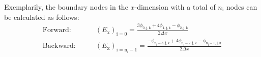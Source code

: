 Exemplarily, the boundary nodes in the $x$-dimension with a total of $n_\mathrm{i}$ nodes can be calculated as follows:
\begin{align}
\text{Forward:}&\quad\quad\left( E_\mathrm{x} \right)_\mathrm{i = \mathrm{0}} = \frac{3\phi_\mathrm{\mathrm{0}, j, k} + 4\phi_\mathrm{\mathrm{1}, j, k} - \phi_\mathrm{\mathrm{2}, j, k}}{2\Delta x}\\
\text{Backward:}&\quad\quad    \left( E_\mathrm{x} \right)_\mathrm{i = n_\mathrm{i}-1} = \frac{-\phi_\mathrm{n_\mathrm{i}-3, j, k} + 4\phi_\mathrm{n_\mathrm{i}-2, j, k} - \phi_\mathrm{n_\mathrm{i}-1, j, k}}{2\Delta x}
\end{align}


\begin{comment}

\begin{align}
    f_{i-2} - 4f_{i-1} &= f_i + (2\Delta x)\frac{\partial f}{\partial x} + 2(\Delta x)^2 \frac{\partial^2 f}{\partial x^2} - 4f_i - 4\Delta x \frac{\partial f}{\partial x} - \frac{4(\Delta x)^2}{2} \frac{\partial^2 f}{\partial x^2}\\
    &= -3f_i + 2\Delta x \frac{\partial f}{\partial x}\\
    \intertext{Umstellen der Gleichung führt zu:}
\end{align}


We use again taylor expansion for any function:
\begin{align}
f_{i+1} &= f_i + \frac{\Delta x}{1} \frac{\partial f}{\partial x} + \frac{(\Delta x)^2}{2} \frac{\partial^2 f}{\partial x^2} + \text{HOT}\\
f_{i-1} &= f_i - \frac{\Delta x}{1} \frac{\partial f}{\partial x} + \frac{(\Delta x)^2}{2} \frac{\partial^2 f}{\partial x^2} + \text{HOT}
\end{align}



\begin{align}
    \text{Forward:}  \quad\quad \frac{\partial f}{\partial x} &\approx \frac{f_{i+1} - f_i}{\Delta x}\\
    \text{Backward:}  \quad\quad\frac{\partial f}{\partial x} &\approx \frac{f_i - f_{i-1}}{\Delta x}
\end{align}



Actually dont have to write Equations again down just ref via \ref{Eq: Taylor i+1} for i+1 and \ref{Eq: Taylor i-1} for i-1
we subtract the second equation from the first. This gives us

- Unterscheiden zwischen:\\
1. linker node -> forward\\
2. Rechter noder -> backward\\ 
3. Central node -> normal\\

\end{comment}